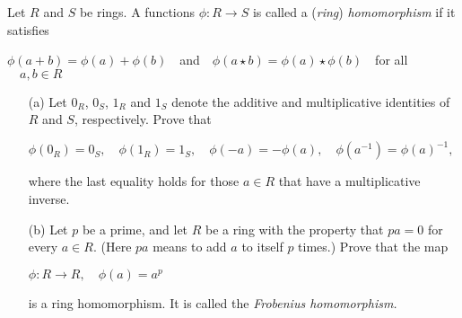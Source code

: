 
\begin{exer}[2.31] Let $R$ and $S$ be rings. A functions $\phi: R \rightarrow S$ is called a (\textit{ring}) \textit{homomorphism} if it satisfies \begin{center}
    $\phi(a+b)=\phi(a) + \phi(b) \quad$and$\quad \phi(a \star b) = \phi(a) \star \phi(b)\quad$for all$\quad a, b \in R$
\end{center}
\begin{enumerate}
    \item [(a)] Let $0_R$, $0_S$, $1_R$ and $1_S$ denote the additive and multiplicative identities of $R$ and $S$, respectively. Prove that \begin{center}
        $\phi(0_R)=0_S,\quad \phi(1_R)=1_S, \quad \phi(-a)=-\phi(a), \quad \phi(a^{-1})=\phi(a)^{-1},$
    \end{center} where the last equality holds for those $a \in R$ that have a multiplicative inverse.
    \item [(b)] Let $p$ be a prime, and let $R$ be a ring with the property that $pa = 0$ for every $a \in R$. (Here $pa$ means to add $a$ to itself $p$ times.) Prove that the map \begin{center}
        $\phi: R \rightarrow R, \quad \phi(a)=a^p$
    \end{center} is a ring homomorphism. It is called the \textit{Frobenius homomorphism.}
\end{enumerate}

\end{exer}
